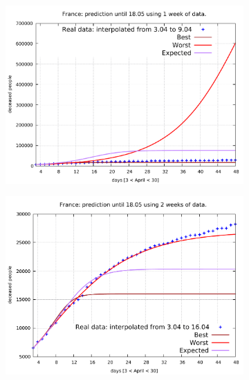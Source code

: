 \documentclass[8pt]{article}
\begin{document}
\begin{figure}[h!]
  \centering
  \begin{subfigure}[b]{0.45\linewidth}
  \includegraphics[width=\linewidth]{../simulations/fr/3-9/3-9.pdf}
  \end{subfigure}
  \begin{subfigure}[b]{0.45\linewidth}
    \includegraphics[width=\linewidth]{../simulations/fr/3-16/3-16.pdf}
  \end{subfigure}
  \begin{subfigure}[b]{0.45\linewidth}

\end{subfigure}
\end{figure}
\end{document}

